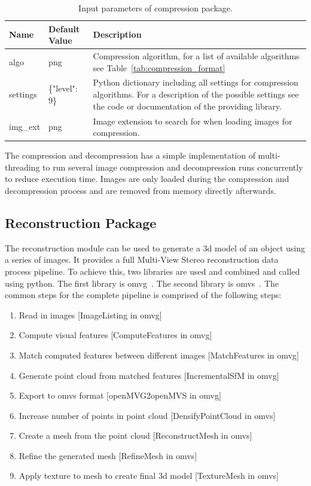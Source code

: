 \begin{table}[htb]
    \centering
    \caption{Input parameters of compression package.}
    \label{tab:compression_settings}
    \begin{tabular}{p{}|p{}|p{}}
        \textbf{Name} & \textbf{Default Value} & \textbf{Description} \\ \hline
        algo    & \gls{png}          & Compression algorithm, for a list of available algorithms see Table~\ref{tab:compression_format}\\
        settings    & \{"level": 9\} & Python dictionary including all settings for compression algorithms. For a description of the possible settings see the code or documentation of the providing library. \\
        img\_ext    & \gls{png}          & Image extension to search for when loading images for compression. 
    \end{tabular}
\end{table}

The compression and decompression has a simple implementation of multi-threading to run several image compression and decompression runs concurrently to reduce execution time. Images are only loaded during the compression and decompression process and are removed from memory directly afterwards.

\subsection{Reconstruction Package}
The reconstruction module can be used to generate a \gls{3d} model of an object using a series of images. It provides a full Multi-View Stereo reconstruction data process pipeline. To achieve this, two libraries are used and combined and called using python. The first library is \gls{omvg}~\cite{openMVG}. The second library is \gls{omvs}~\cite{openMVS}. 
The common steps for the complete pipeline is comprised of the following steps:
\begin{enumerate}
    \item Read in images [ImageListing in \gls{omvg}]
    \item Compute visual features [ComputeFeatures in \gls{omvg}]
    \item Match computed features between different images [MatchFeatures in \gls{omvg}]
    \item Generate point cloud from matched features [IncrementalSfM in \gls{omvg}]
    \item Export to \gls{omvs} format [openMVG2openMVS in \gls{omvg}]
    \item Increase number of points in point cloud [DensifyPointCloud in \gls{omvs}]
    \item Create a mesh from the point cloud [ReconstructMesh in \gls{omvs}]
    \item Refine the generated mesh [RefineMesh in \gls{omvs}]
    \item Apply texture to mesh to create final \gls{3d} model [TextureMesh in \gls{omvs}]
\end{enumerate}

